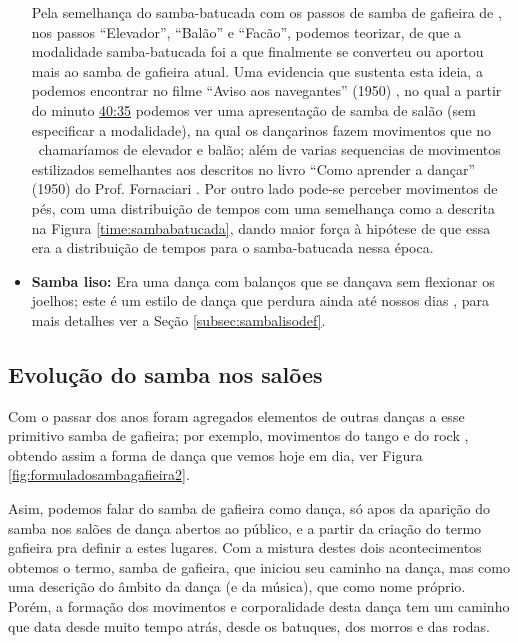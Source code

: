 \begin{itemize}
Pela semelhança do samba-batucada com os passos de samba de gafieira de \AnoLivro,
nos passos ``Elevador'', ``Balão'' e ``Facão'', podemos teorizar, de que a modalidade samba-batucada foi
a que finalmente se converteu ou aportou mais ao samba de gafieira atual.
Uma evidencia que sustenta esta ideia, a podemos encontrar no filme ``Aviso aos navegantes'' (1950) \cite[min. 40:35]{AtlantidaDance},
no qual a partir do minuto \href{http://www.bcc.org.br/filmes/443382}{40:35} podemos ver uma apresentação de samba de salão (sem especificar a modalidade),
na qual os dançarinos fazem movimentos que no \AnoLivro~chamaríamos de elevador e balão; 
além de varias sequencias de movimentos estilizados semelhantes aos descritos no livro ``Como aprender a dançar'' (1950) do Prof. Fornaciari \cite[pp. 163]{fornaciari1950aprender}.
Por outro lado pode-se perceber movimentos de pés, 
com uma distribuição de tempos com uma semelhança como a descrita na Figura \ref{time:sambabatucada},
dando maior força à hipótese de que essa era a distribuição de tempos para o samba-batucada nessa época. 

\item \textbf{Samba liso:}
Era uma dança com balanços que se dançava sem flexionar os joelhos;
este é um estilo de dança que perdura ainda até nossos 
dias \cite[pp. 58,62]{freitas1959danca} \cite[pp. 61]{fornaciari1950aprender} \cite[pp. 143]{perna2002samba}, 
para mais detalhes ver a Seção \ref{subsec:sambalisodef}.
\end{itemize}

\subsection{Evolução do samba nos salões}

Com o passar dos anos foram agregados elementos de outras danças a esse primitivo samba de gafieira;
por exemplo, movimentos do tango e do rock \cite[pp. 142]{perna2002samba}, 
obtendo assim a forma de dança que vemos hoje em dia, ver Figura \ref{fig:formuladosambagafieira2}.

Asim, podemos falar do samba de gafieira como dança, só apos da aparição do samba nos
salões de dança abertos ao público, e a partir da criação do termo gafieira pra definir a estes lugares.
Com a mistura destes dois acontecimentos obtemos o termo, samba de gafieira,
que iniciou seu caminho na dança, mas como uma descrição do âmbito da dança (e da música), que como nome próprio.
Porém, a formação dos movimentos e corporalidade desta dança tem um caminho que data desde muito tempo atrás,
desde os batuques, dos morros e das rodas.


